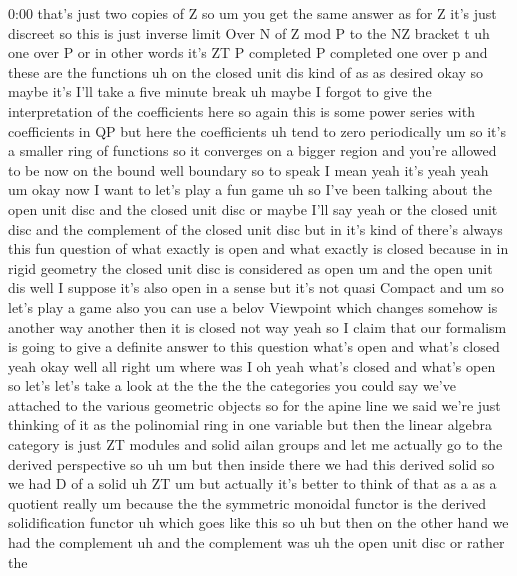\begin{unfinished}{0:00}
that's  just  two  copies  of  Z  so  um  you
get  the  same  answer  as  for  Z  it's  just
discreet  so  this  is  just  inverse  limit
Over  N  of  Z  mod  P  to  the
NZ  bracket
t  uh  one  over
P  or  in  other  words  it's  ZT  P
completed  P  completed  one  over  p  and
these  are  the
functions  uh  on  the  closed  unit
dis  kind  of  as  as
desired  okay  so  maybe  it's  I'll  take  a
five  minute
break  uh  maybe  I  forgot  to  give  the
interpretation  of  the  coefficients  here
so  again  this  is  some  power  series  with
coefficients  in  QP  but  here  the
coefficients  uh  tend  to  zero
periodically
um  so  it's  a  smaller  ring  of  functions
so  it  converges  on  a  bigger  region  and
you're  allowed  to  be  now  on  the  bound
well  boundary  so  to  speak  I
mean  yeah  it's  yeah
yeah
um  okay  now  I  want  to  let's  play  a  fun
game
uh  so  I've  been  talking  about  the  open
unit  disc  and  the  closed  unit  disc  or
maybe  I'll  say  yeah  or  the  closed  unit
disc  and  the  complement  of  the  closed
unit  disc  but  in  it's  kind  of  there's
always  this  fun  question  of  what  exactly
is  open  and  what  exactly  is  closed
because  in  in  rigid  geometry  the  closed
unit  disc  is  considered  as
open  um  and  the  open  unit  dis  well  I
suppose  it's  also  open  in  a  sense  but
it's  not  quasi  Compact
and
um  so  let's  play  a  game  also  you  can  use
a  belov  Viewpoint  which  changes  somehow
is  another  way  another  then  it  is  closed
not  way  yeah  so  I  claim  that  our
formalism  is  going  to  give  a  definite
answer  to  this  question  what's  open  and
what's  closed  yeah  okay  well  all  right
um  where  was  I  oh  yeah  what's  closed  and
what's
open  so  let's  let's  take  a  look  at  the
the
the  the  categories  you  could  say  we've
attached  to  the  various  geometric
objects  so  for  the  apine  line  we  said
we're  just  thinking  of  it  as  the
polinomial  ring  in  one  variable  but  then
the  linear  algebra  category  is  just  ZT
modules  and  solid  ailan  groups  and  let
me  actually  go  to  the  derived
perspective
so
uh  um  but  then  inside  there  we  had  this
derived  solid  so  we  had  D  of  a
solid  uh
ZT  um  but  actually  it's  better  to  think
of  that  as  a  as  a  quotient  really  um
because  the  the  symmetric  monoidal
functor  is  the  derived  solidification
functor  uh  which  goes  like  this
so  uh  but  then  on  the  other  hand  we  had
the  complement  uh  and  the  complement
was  uh  the  open  unit  disc  or  rather  the

\end{unfinished}
